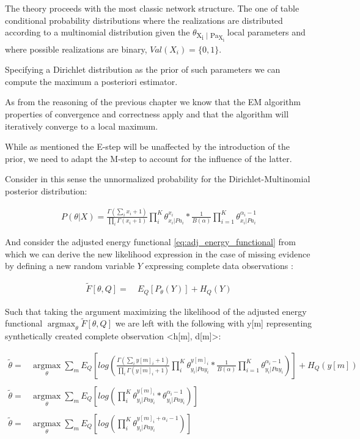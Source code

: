 \documentclass[11pt]{article}
\begin{document}
\begin{article}
The theory proceeds with the most classic network structure. The
one of table conditional probability distributions where the
realizations are distributed according to a multinomial
distribution given the \(\theta\)\textsubscript{X\textsubscript{i} | Pa\textsubscript{X\textsubscript{i}}} local parameters and
where possible realizations are binary, \(Val(X_i) = \{0,1 \}\).

Specifying a Dirichlet distribution as the prior of such parameters
we can compute the maximum a posteriori estimator.

As from the reasoning of the previous chapter we know that the EM
algorithm properties of convergence and correctness apply and that
the algorithm will iteratively converge to a local maximum.

While as mentioned the E-step will be unaffected by the
introduction of the prior, we need to adapt the M-step to account
for the influence of the latter.

Consider in this sense the unnormalized probability for the
Dirichlet-Multinomial posterior distribution:

\begin{align} \label{eq:dirichlet-multinomial-score}
P(\theta | X) = \frac{\Gamma(\sum_i x_i + 1)}{\prod_i \Gamma(x_i + 1)} \prod_i^K \theta_{x_i | Pa_i}^{x_i}  * \frac{1}{B(\alpha)} \prod_{i=1}^K \theta_{x_i | Pa_i}^{\alpha_i - 1}
\end{align}

And consider the adjusted energy functional
\ref{eq:adj_energy_functional} from which we can derive the new
likelihood expression in the case of missing evidence by defining a
new random variable \(Y\) expressing complete data observations
\(<H, D>\):

\begin{align} \label{eq:dirichlet-multinomial-likelihood}
\tilde{F}[\theta, Q] =& \ E_Q[P_\theta(Y)] + H_Q (Y)
\end{align}

Such that taking the argument maximizing the likelihood of the
adjusted energy functional \(\operatorname*{argmax}_{\theta}
    \tilde{F}[\theta, Q]\) we are left with the following with y[m]
representing synthetically created complete observation <h[m],
d[m]>:

\begin{align} \label{eq:first-order-condition}
\tilde{\theta} =& \operatorname*{argmax}_{\theta} \sum_m E_Q[log(\frac{\Gamma(\sum_i y[m]_i + 1)}{\prod_i \Gamma(y[m]_i + 1)} \prod_i^K \theta_{y_i | Pa{y_i}}^{y[m]_i} * \frac{1}{B(\alpha)} \prod_{i=1}^K \theta_{y_i | Pa{y_i}}^{\alpha_i - 1})] + H_Q (y[m]) \\
\nonumber\\   
\tilde{\theta} =& \operatorname*{argmax}_{\theta} \sum_m E_Q[log(\prod_i^K \theta_{y_i | Pa{y_i}}^{y[m]_i} * \theta_{y_i | Pa{y_i}}^{\alpha_i - 1})]\\
\nonumber\\   
\tilde{\theta} =& \operatorname*{argmax}_{\theta} \sum_m E_Q[log(\prod_i^K \theta_{y_i | Pa{y_i}}^{y[m]_i + \alpha_i - 1})] 
\end{align}


\end{article}
\end{document}
